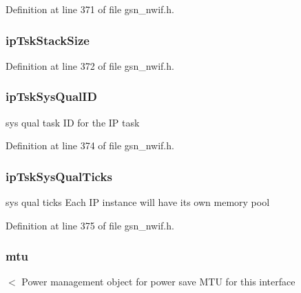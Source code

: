 Definition at line 371 of file gsn\_\-nwif.h.

\hypertarget{a00169_a921646fe063cf448e229e452b74cc2ac}{
\subsubsection[{ipTskStackSize}]{ {\bf ipTskStackSize}}}
\label{a00169_a921646fe063cf448e229e452b74cc2ac}


Definition at line 372 of file gsn\_\-nwif.h.

\hypertarget{a00169_ac3725e3448e4a6cab8f95add0cba081d}{
\subsubsection[{ipTskSysQualID}]{ {\bf ipTskSysQualID}}}
\label{a00169_ac3725e3448e4a6cab8f95add0cba081d}
sys qual task ID for the IP task 

Definition at line 374 of file gsn\_\-nwif.h.

\hypertarget{a00169_a48d8468fd7b93150628214b3bea70853}{
\subsubsection[{ipTskSysQualTicks}]{ {\bf ipTskSysQualTicks}}}
\label{a00169_a48d8468fd7b93150628214b3bea70853}
sys qual ticks Each IP instance will have its own memory pool 

Definition at line 375 of file gsn\_\-nwif.h.

\hypertarget{a00169_a29e099f0875d30b6a75ee68c747dde11}{
\subsubsection[{mtu}]{ {\bf mtu}}}
\label{a00169_a29e099f0875d30b6a75ee68c747dde11}
$<$ Power management object for power save MTU for this interface 

